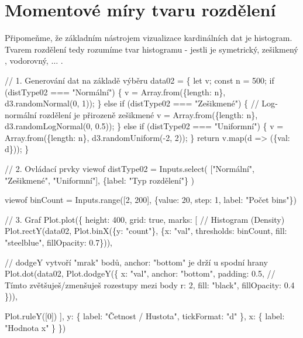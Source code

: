 \documentclass[
  czech,
  11pt,
  letterpaper,
  DIV=11,
  numbers=noendperiod]{scrreprt}
\newenvironment{Shaded}{\begin{snugshade}}{\end{snugshade}}
\newcommand{\NormalTok}[1]{\textcolor[rgb]{0.00,0.23,0.31}{#1}}
\begin{document}
\section{Momentové míry tvaru
rozdělení}\label{momentovuxe9-muxedry-tvaru-rozdux11blenuxed}

Připomeňme, že základním nástrojem vizualizace kardinálních dat je
histogram. Tvarem rozdělení tedy rozumíme tvar histogramu - jestli je
symetrický, zešikmený , vodorovný, \(\dots\) .

\begin{Shaded}
\begin{Highlighting}[]
\NormalTok{// 1. Generování dat na základě výběru}
\NormalTok{data02 = \{}
\NormalTok{  let v;}
\NormalTok{  const n = 500;}
\NormalTok{  if (distType02 === "Normální") \{}
\NormalTok{    v = Array.from(\{length: n\}, d3.randomNormal(0, 1));}
\NormalTok{  \} else if (distType02 === "Zešikmené") \{}
\NormalTok{    // Log{-}normální rozdělení je přirozeně zešikmené}
\NormalTok{    v = Array.from(\{length: n\}, d3.randomLogNormal(0, 0.5));}
\NormalTok{  \} else if (distType02 === "Uniformní") \{}
\NormalTok{    v = Array.from(\{length: n\}, d3.randomUniform({-}2, 2));}
\NormalTok{  \}}
\NormalTok{  return v.map(d =\textgreater{} (\{val: d\}));}
\NormalTok{\}}

\NormalTok{// 2. Ovládací prvky}
\NormalTok{viewof distType02 = Inputs.select(}
\NormalTok{  ["Normální", "Zešikmené", "Uniformní"], }
\NormalTok{  \{label: "Typ rozdělení"\}}
\NormalTok{)}

\NormalTok{viewof binCount = Inputs.range([2, 200], \{value: 20, step: 1, label: "Počet bins"\})}

\NormalTok{// 3. Graf}
\NormalTok{Plot.plot(\{}
\NormalTok{  height: 400,}
\NormalTok{  grid: true,}
\NormalTok{  marks: [}
\NormalTok{    // Histogram (Density)}
\NormalTok{    Plot.rectY(data02, Plot.binX(\{y: "count"\}, \{x: "val", thresholds: binCount, fill: "steelblue", fillOpacity: 0.7\})),}
    
\NormalTok{  // dodgeY vytvoří "mrak" bodů, anchor: "bottom" je drží u spodní hrany}
\NormalTok{    Plot.dot(data02, Plot.dodgeY(\{}
\NormalTok{      x: "val", }
\NormalTok{      anchor: "bottom", }
\NormalTok{      padding: 0.5, // Tímto zvětšuješ/zmenšuješ rozestupy mezi body}
\NormalTok{      r: 2, }
\NormalTok{      fill: "black",}
\NormalTok{      fillOpacity: 0.4}
\NormalTok{    \})),}
    
\NormalTok{    Plot.ruleY([0])}
\NormalTok{  ],}
\NormalTok{  y: \{}
\NormalTok{    label: "Četnost / Hustota",}
\NormalTok{    tickFormat: "d"}
\NormalTok{  \},}
\NormalTok{  x: \{}
\NormalTok{    label: "Hodnota x"}
\NormalTok{  \}}
\NormalTok{\})}
\end{Highlighting}
\end{Shaded}
\end{document}
